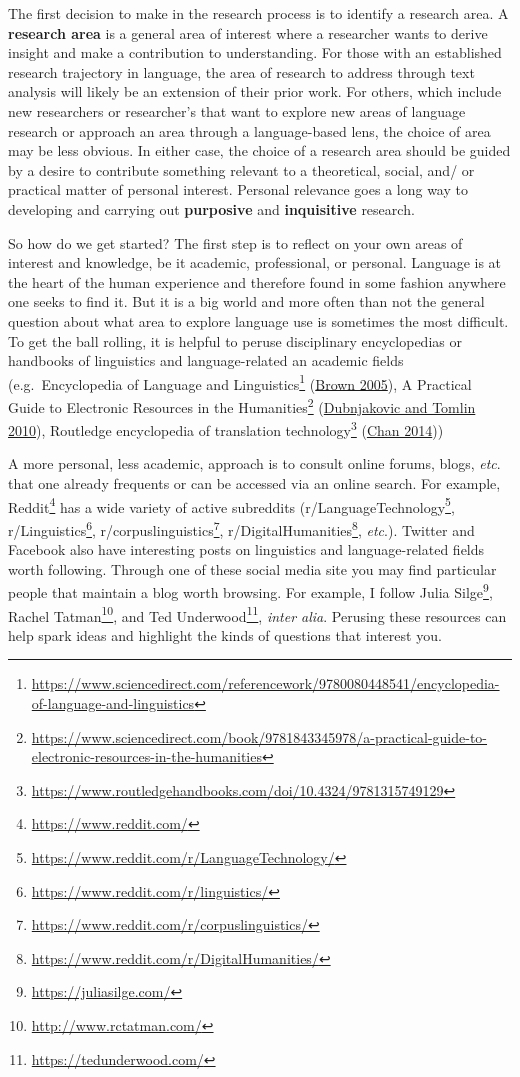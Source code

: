 \documentclass[
  letterpaper,
  DIV=11,
  numbers=noendperiod]{scrreport}
\theoremstyle{definition}
\theoremstyle{remark}
\DeclareRobustCommand{\href}[2]{#2\footnote{\url{#1}}}
\begin{document}
The first decision to make in the research process is to identify a
research area. A \textbf{research area} is a general area of interest
where a researcher wants to derive insight and make a contribution to
understanding. For those with an established research trajectory in
language, the area of research to address through text analysis will
likely be an extension of their prior work. For others, which include
new researchers or researcher's that want to explore new areas of
language research or approach an area through a language-based lens, the
choice of area may be less obvious. In either case, the choice of a
research area should be guided by a desire to contribute something
relevant to a theoretical, social, and/ or practical matter of personal
interest. Personal relevance goes a long way to developing and carrying
out \textbf{purposive} and \textbf{inquisitive} research.

So how do we get started? The first step is to reflect on your own areas
of interest and knowledge, be it academic, professional, or personal.
Language is at the heart of the human experience and therefore found in
some fashion anywhere one seeks to find it. But it is a big world and
more often than not the general question about what area to explore
language use is sometimes the most difficult. To get the ball rolling,
it is helpful to peruse disciplinary encyclopedias or handbooks of
linguistics and language-related an academic fields
(e.g.~\href{https://www.sciencedirect.com/referencework/9780080448541/encyclopedia-of-language-and-linguistics}{Encyclopedia
of Language and Linguistics} (\protect\hyperlink{ref-Brown2005}{Brown
2005}),
\href{https://www.sciencedirect.com/book/9781843345978/a-practical-guide-to-electronic-resources-in-the-humanities}{A
Practical Guide to Electronic Resources in the Humanities}
(\protect\hyperlink{ref-Dubnjakovic2010}{Dubnjakovic and Tomlin 2010}),
\href{https://www.routledgehandbooks.com/doi/10.4324/9781315749129}{Routledge
encyclopedia of translation technology}
(\protect\hyperlink{ref-Chan2014}{Chan 2014}))

A more personal, less academic, approach is to consult online forums,
blogs, \emph{etc}. that one already frequents or can be accessed via an
online search. For example, \href{https://www.reddit.com/}{Reddit} has a
wide variety of active subreddits
(\href{https://www.reddit.com/r/LanguageTechnology/}{r/LanguageTechnology},
\href{https://www.reddit.com/r/linguistics/}{r/Linguistics},
\href{https://www.reddit.com/r/corpuslinguistics/}{r/corpuslinguistics},
\href{https://www.reddit.com/r/DigitalHumanities/}{r/DigitalHumanities},
\emph{etc}.). Twitter and Facebook also have interesting posts on
linguistics and language-related fields worth following. Through one of
these social media site you may find particular people that maintain a
blog worth browsing. For example, I follow
\href{https://juliasilge.com/}{Julia Silge},
\href{http://www.rctatman.com/}{Rachel Tatman}, and
\href{https://tedunderwood.com/}{Ted Underwood}, \emph{inter alia}.
Perusing these resources can help spark ideas and highlight the kinds of
questions that interest you.
\end{document}
